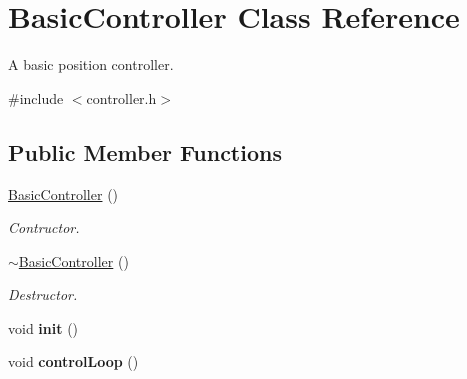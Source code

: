 \hypertarget{classBasicController}{}\section{Basic\+Controller Class Reference}
\label{classBasicController}


A basic position controller.  




{\ttfamily \#include $<$controller.\+h$>$}

\subsection*{Public Member Functions}
\begin{DoxyCompactItemize}
\item 
\mbox{\label{classBasicController_abc17a144ac3ef28ac5c7e252d43f181e}} 
\hyperlink{classBasicController_abc17a144ac3ef28ac5c7e252d43f181e}{Basic\+Controller} ()
\begin{DoxyCompactList}\small\item\em Contructor. \end{DoxyCompactList}\item 
\mbox{\label{classBasicController_a5fb79f16fa38caafb83f92be4e3e4338}} 
\hyperlink{classBasicController_a5fb79f16fa38caafb83f92be4e3e4338}{$\sim$\+Basic\+Controller} ()
\begin{DoxyCompactList}\small\item\em Destructor. \end{DoxyCompactList}\item 
\mbox{\label{classBasicController_aa8a949cd579a036c95788cc0c084fc1a}} 
void {\bfseries init} ()
\item 
\mbox{\label{classBasicController_a09cfd055deb93c90e1b8e4b00ec0ab63}} 
void {\bfseries control\+Loop} ()
\end{DoxyCompactItemize}
